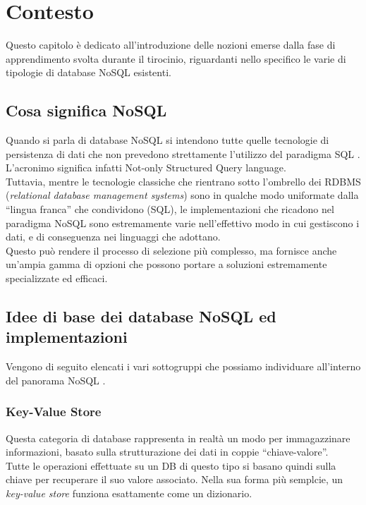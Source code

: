 
\chapter{Contesto}
\label{cap:contesto}

Questo capitolo è dedicato all'introduzione delle nozioni emerse dalla fase di apprendimento svolta durante il tirocinio, riguardanti nello specifico le varie di tipologie di database NoSQL esistenti.\\

\section{Cosa significa NoSQL}
Quando si parla di database NoSQL si intendono tutte quelle tecnologie di persistenza di dati che non prevedono strettamente l'utilizzo del paradigma \gls{SQL} \cite{site:mongoarticlenosql}. L'acronimo significa infatti Not-only Structured Query language.\\
Tuttavia, mentre le tecnologie classiche che rientrano sotto l'ombrello dei RDBMS (\textit{relational database management systems}) sono in qualche modo uniformate dalla ``lingua franca'' che condividono (\gls{SQL}), le implementazioni che ricadono nel paradigma NoSQL sono estremamente varie nell'effettivo modo in cui gestiscono i dati, e di conseguenza nei linguaggi che adottano.\\
Questo può rendere il processo di selezione più complesso, ma fornisce anche un'ampia gamma di opzioni che possono portare a soluzioni estremamente specializzate ed efficaci.\\


\section{Idee di base dei database NoSQL ed implementazioni}
Vengono di seguito elencati i vari sottogruppi che possiamo individuare all'interno del panorama NoSQL \cite{site:mongoarticletypes}.\\

\subsection{Key-Value Store}
Questa categoria di database rappresenta in realtà un modo per immagazzinare informazioni, basato sulla strutturazione dei dati in coppie ``chiave-valore''.\\
Tutte le operazioni effettuate su un DB di questo tipo si basano quindi sulla chiave per recuperare il suo valore associato. Nella sua forma più semplcie, un \textit{key-value store} funziona esattamente come un dizionario.\\

